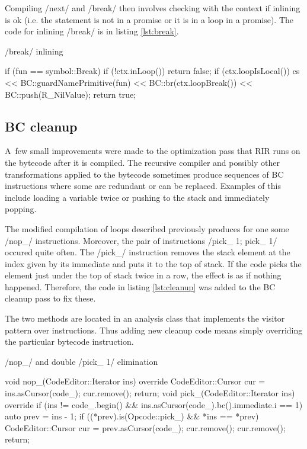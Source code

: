 Compiling \rinline/next/ and \rinline/break/ then involves checking with the context if inlining is ok (i.e. the statement is not in a promise or it is in a loop in a promise). The code for inlining \rinline/break/ is in listing \ref{lst:break}.

\begin{listing}[htbp]
  \caption{\label{lst:break}\rinline/break/ inlining}
  \begin{cppcode}
if (fun == symbol::Break) {
    if (!ctx.inLoop()) return false;
    if (ctx.loopIsLocal()) {
        cs << BC::guardNamePrimitive(fun)
           << BC::br(ctx.loopBreak())
           << BC::push(R_NilValue);
        return true;
    }
}
  \end{cppcode}
\end{listing}


\subsection{BC cleanup}

A~few small improvements were made to the optimization pass that RIR runs on the bytecode after it is compiled. The recursive compiler and possibly other transformations applied to the bytecode sometimes produce sequences of BC instructions where some are redundant or can be replaced. Examples of this include loading a variable twice or pushing to the stack and immediately popping.

The modified compilation of loops described previously produces for one some \cinline/nop_/ instructions. Moreover, the pair of instructions \cinline/pick_ 1; pick_ 1/ occured quite often. The \cinline/pick_/ instruction removes the stack element at the index given by its immediate and puts it to the top of stack. If the code picks the element just under the top of stack twice in a row, the effect is as if nothing happened. Therefore, the code in listing \ref{lst:cleanup} was added to the BC cleanup pass to fix these.

The two methods are located in an analysis class that implements the visitor pattern over instructions. Thus adding new cleanup code means simply overriding the particular bytecode instruction.

\begin{listing}[htbp]
  \caption{\label{lst:cleanup}\cinline/nop_/ and double \cinline/pick_ 1/ elimination}
  \begin{cppcode}
void nop_(CodeEditor::Iterator ins) override {
    CodeEditor::Cursor cur = ins.asCursor(code_);
    cur.remove();
    return;
}
void pick_(CodeEditor::Iterator ins) override {
    if (ins != code_.begin() &&
        ins.asCursor(code_).bc().immediate.i == 1) {
        auto prev = ins - 1;
        if ((*prev).is(Opcode::pick_) && *ins == *prev) {
            CodeEditor::Cursor cur = prev.asCursor(code_);
            cur.remove();
            cur.remove();
            return;
        }
    }
}
  \end{cppcode}
\end{listing}

